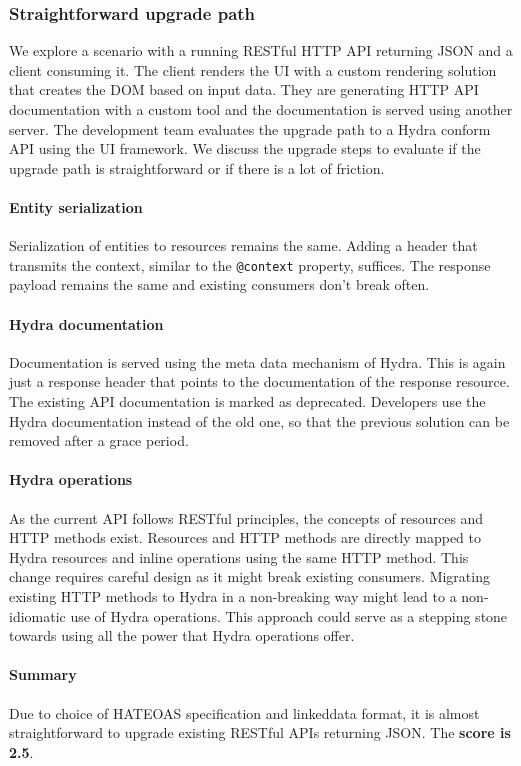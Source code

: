 \subsubsection{Straightforward upgrade path}
We explore a scenario with a running RESTful HTTP API returning JSON and a client consuming it. The client renders the UI with a custom rendering solution that creates the DOM based on input data. They are generating HTTP API documentation with a custom tool and the documentation is served using another server. The development team evaluates the upgrade path to a Hydra conform API using the UI framework. We discuss the upgrade steps to evaluate if the upgrade path is straightforward or if there is a lot of friction.

\paragraph{Entity serialization}
Serialization of entities to resources remains the same. Adding a header that transmits the context, similar to the \lstinline{@context} property, suffices. The response payload remains the same and existing consumers don't break often.

\paragraph{Hydra documentation}
Documentation is served using the meta data mechanism of Hydra. This is again just a response header that points to the documentation of the response resource. The existing API documentation is marked as deprecated. Developers use the Hydra documentation instead of the old one, so that the previous solution can be removed after a grace period.

\paragraph{Hydra operations}
As the current API follows RESTful principles, the concepts of resources and HTTP methods exist. Resources and HTTP methods are directly mapped to Hydra resources and inline operations using the same HTTP method. This change requires careful design as it might break existing consumers. Migrating existing HTTP methods to Hydra in a non-breaking way might lead to a non-idiomatic use of Hydra operations. This approach could serve as a stepping stone towards using all the power that Hydra operations offer.

\paragraph{Summary}
Due to choice of HATEOAS specification and \gls{linkeddata} format, it is almost straightforward to upgrade existing RESTful APIs returning JSON. The \textbf{score is 2.5}.

